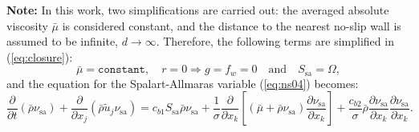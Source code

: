 \documentclass[10pt]{article}
\newcommand{\pp}[2]{\frac{\partial #1}{\partial #2}}
\newcommand{\sa}{\nu_{\mathrm{sa}}}
\newcommand{\tsa}{\mathrm{sa}}
\newcommand{\bmu}{\bar{\mu}}
\begin{document}
\textbf{Note:} In this work, two simplifications are carried out: the averaged absolute viscosity $\bmu$ is considered constant, and the distance to the nearest no-slip wall is assumed to be infinite, $d\rightarrow\infty$. Therefore, the following terms are simplified in (\ref{eq:closure}):
\begin{equation}
\label{eq:closure01}
\bmu=\texttt{constant},\quad r=0 \Rightarrow g=f_w=0 \quad\mbox{and}\quad  S_\tsa=\Omega,
\end{equation}
and the equation for the Spalart-Allmaras variable (\ref{eq:ns04}) becomes:
\begin{equation}\label{eq:ns05}
\pp{}{t}(\bar{\rho} \sa) + \pp{}{x_j} (\bar{\rho} \tilde{u}_j \sa) =  c_{b1} S_{\mathrm{sa}} \bar{\rho} \sa + \frac{1}{\sigma} \pp{}{x_k} \left[ (\bar{\mu} + \bar{\rho} \sa) \pp{\sa}{x_k} \right] + \frac{c_{b2}}{\sigma} \bar{\rho} \pp{\sa}{x_k} \pp{\sa}{x_k}.
\end{equation}
\end{document}
